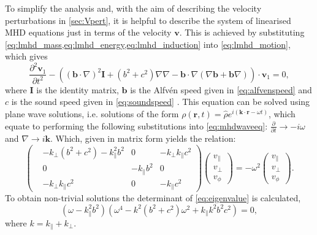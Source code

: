 \documentclass[a4paper,12pt,fourier,authoryear,custommargin]{Classes/PhDThesisPSnPDF}
\renewcommand{\vec}{\mathbf}
\begin{document}
To simplify the analysis and, with the aim of describing the velocity perturbations in \cref{sec:Vpert}, it is helpful to describe the system of linearised MHD equations just in terms of the velocity $\vec{v}$.
This is achieved by substituting \cref{eq:lmhd_mass,eq:lmhd_energy,eq:lmhd_induction} into \cref{eq:lmhd_motion}, which gives
\begin{equation}
    \frac{\partial^2 \vec{v}_1}{\partial t^2} - \left( (\vec{b} \cdot \nabla)^2 \vec{I} + (b^2 + c^2) \nabla\nabla - \vec{b} \cdot \nabla (\nabla\vec{b} + \vec{b}\nabla) \right) \cdot \vec{v}_1 = 0,\label{eq:mhdwaveeq}
\end{equation}
where $\vec{I}$ is the identity matrix, $\vec{b}$ is the Alfv\'en speed given in \cref{eq:alfvenspeed} and $c$ is the sound speed given in \cref{eq:soundspeed} \citep{goedbloed2004}.
This equation can be solved using plane wave solutions, i.e. solutions of the form $\rho(\vec{r}, t) = \hat{\rho} e^{i(\vec{k}\cdot\vec{r} - \omega t)}$, which equate to performing the following substitutions into \cref{eq:mhdwaveeq}: $\frac{\partial}{\partial t} \rightarrow - i \omega$ and $\nabla \rightarrow i \vec{k}$.
Which, given in matrix form yields the relation:
\begin{equation}
\begin{pmatrix}
    &-k_\perp(b^2+c^2)-k_\parallel^2 b^2			& 0			& -k_\perp k_\parallel c^2\\
    & 0									&-k_\parallel b^2	& 0\\
    &-k_\perp k_\parallel c^2					& 0			& -k_\parallel c^2
\end{pmatrix}
\begin{pmatrix}
v_\parallel\\
v_\perp\\
v_\phi
\end{pmatrix}
= - \omega^2
\begin{pmatrix}
v_\parallel\\
v_\perp\\
v_\phi
\end{pmatrix}.\label{eq:eigenvalue}
\end{equation}
To obtain non-trivial solutions the determinant of \cref{eq:eigenvalue} is calculated,
\begin{equation}
    (\omega - k_\parallel^2 b^2)\left( \omega^4 - k^2(b^2+c^2)\omega^2 + k_\parallel k^2b^2c^2 \right) = 0,
\end{equation}
where $k = k_\parallel + k_\perp$.
\end{document}

